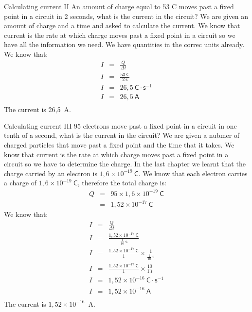 \begin{wex}{Calculating current II}
{An amount of charge equal to 53 C moves past a fixed point in a circuit in 2 seconds, what is the current in the circuit?
}{%
We are given an amount of charge and a time and asked to calculate the current. We know that current is the rate at which charge moves past a fixed point in a circuit so we have all the information we need. We have quantities in the correc units already.
We know that:
\begin{eqnarray*}
I &=& \frac{Q}{\Delta t} \\
I &=& \frac{53~\mathsf{C}}{2~\mathsf{s}} \\
I &=& 26,5~\mathsf{C} \cdot \mathsf{s}^{-1} \\
I &=& 26,5~\mathsf{A} \\
\end{eqnarray*}
The current is 26,5~A.
}
\end{wex}

\begin{wex}{Calculating current III}
{95 electrons move past a fixed point in a circuit in one tenth of a second, what is the current in the circuit?
}{%
We are given a nubmer of charged particles that move past a fixed point and the time that it takes.
We know that current is the rate at which charge moves past a fixed point in a circuit so we have to determine the 
charge. In the last chapter we learnt that the charge carried by an electron is $1,6\times10^{-19}~\mathsf{C}$.
We know that each electron carries a charge of $1,6\times10^{-19}~\mathsf{C}$, therefore the total charge is:
\begin{eqnarray*}
Q & = & 95 \times 1,6\times10^{-19}~\mathsf{C} \\
& = & 1,52\times10^{-17}~\mathsf{C} 
\end{eqnarray*}
We know that:
\begin{eqnarray*}
I &=& \frac{Q}{\Delta t} \\
I &=& \frac{1,52\times10^{-17}~\mathsf{C}}{\frac{1}{10}~\mathsf{s}} \\
I &=& \frac{1,52\times10^{-17}~\mathsf{C}}{1}\times{\frac{1}{{\frac{1}{10}~\mathsf{s}}}} \\
I &=& \frac{1,52\times10^{-17}~\mathsf{C}}{1}\times\frac{10}{1~\mathsf{s}} \\
I &=& 1,52\times10^{-16}~\mathsf{C} \cdot \mathsf{s}^{-1} \\
I &=& 1,52\times10^{-16}~\mathsf{A} \\
\end{eqnarray*}
The current is $1,52\times10^{-16}$~A.
}
\end{wex}


